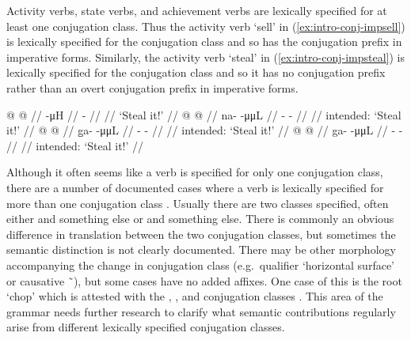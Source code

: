 \documentclass[12pt,letterpaper,oneside,article]{memoir}
\begin{document}
Activity verbs, state verbs, and achievement verbs are lexically specified for at least one conjugation class.
Thus the activity verb  ‘sell’ in (\ref{ex:intro-conj-impsell}) is lexically specified for the  conjugation class and so has the  conjugation prefix in imperative forms.
Similarly, the activity verb  ‘steal’ in (\ref{ex:intro-conj-impsteal}) is lexically specified for the  conjugation class and so it has no conjugation prefix rather than an overt conjugation prefix in imperative forms.

\pex\label{ex:intro-conj-impsteal}%
\a\label{ex:intro-conj-impsteal-z}%
%
\begingl
	\gla	{} @ {} @ {} //
	\glb	{}  -μH //
	\glc	{}\·  - //
	\gld	{} {} {} //
	\glft	‘Steal it!’
		//
\endgl
\a\label{ex:intro-conj-impsteal-n}%
\ljudge{*}%
%
\begingl
	\gla	{} @ {} @ {} //
	\glb	na-  -μμL //
	\glc	{}-  - //
	\gld	{} {} {} //
	\glft	intended: ‘Steal it!’
		//
\endgl
\a\label{ex:intro-conj-impsteal-gh}%
\ljudge{*}%
%
\begingl
	\gla	{} @ {} @ {} //
	\glb	g̱a-  -μμL //
	\glc	{}-  - //
	\gld	{} {} {} //
	\glft	intended: ‘Steal it!’
		//
\endgl
\a\label{ex:intro-conj-impsteal-g}%
\ljudge{*}%
%
\begingl
	\gla	{} @ {} @ {} //
	\glb	ga-  -μμL //
	\glc	{}-  - //
	\gld	{} {} {} //
	\glft	intended: ‘Steal it!’
		//
\endgl
\xe

Although it often seems like a verb is specified for only one conjugation class, there are a number of documented cases where a verb is lexically specified for more than one conjugation class \parencite[615–616]{crippen:2019}.
Usually there are two classes specified, often either  and something else or  and something else.
There is commonly an obvious difference in translation between the two conjugation classes, but sometimes the semantic distinction is not clearly documented.
There may be other morphology accompanying the change in conjugation class (e.g.\ qualifier  ‘horizontal surface’ or causative  \~\ ), but some cases have no added affixes.
One case of this is the root  ‘chop’ which is attested with the , , and  conjugation classes \parencites[09/274–275]{leer:1973}[526]{leer:1976}.
This area of the grammar needs further research to clarify what semantic contributions regularly arise from different lexically specified conjugation classes.
\end{document}
